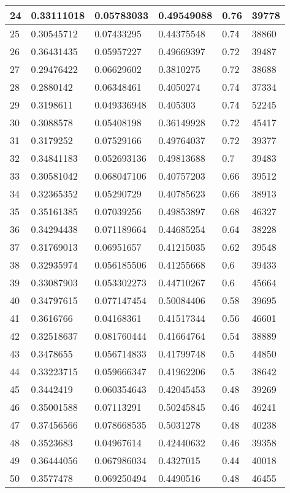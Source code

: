 \begin{longtable}{|l|l|l|l|l|l|}
24 & 0.33111018 & 0.05783033 & 0.49549088 & 0.76 & 39778 \\ \hline 
25 & 0.30545712 & 0.07433295 & 0.44375548 & 0.74 & 38860 \\ \hline 
26 & 0.36431435 & 0.05957227 & 0.49669397 & 0.72 & 39487 \\ \hline 
27 & 0.29476422 & 0.06629602 & 0.3810275 & 0.72 & 38688 \\ \hline 
28 & 0.2880142 & 0.06348461 & 0.4050274 & 0.74 & 37334 \\ \hline 
29 & 0.3198611 & 0.049336948 & 0.405303 & 0.74 & 52245 \\ \hline 
30 & 0.3088578 & 0.05408198 & 0.36149928 & 0.72 & 45417 \\ \hline 
31 & 0.3179252 & 0.07529166 & 0.49764037 & 0.72 & 39377 \\ \hline 
32 & 0.34841183 & 0.052693136 & 0.49813688 & 0.7 & 39483 \\ \hline 
33 & 0.30581042 & 0.068047106 & 0.40757203 & 0.66 & 39512 \\ \hline 
34 & 0.32365352 & 0.05290729 & 0.40785623 & 0.66 & 38913 \\ \hline 
35 & 0.35161385 & 0.07039256 & 0.49853897 & 0.68 & 46327 \\ \hline 
36 & 0.34294438 & 0.071189664 & 0.44685254 & 0.64 & 38228 \\ \hline 
37 & 0.31769013 & 0.06951657 & 0.41215035 & 0.62 & 39548 \\ \hline 
38 & 0.32935974 & 0.056185506 & 0.41255668 & 0.6 & 39433 \\ \hline 
39 & 0.33087903 & 0.053302273 & 0.44710267 & 0.6 & 45664 \\ \hline 
40 & 0.34797615 & 0.077147454 & 0.50084406 & 0.58 & 39695 \\ \hline 
41 & 0.3616766 & 0.04168361 & 0.41517344 & 0.56 & 46601 \\ \hline 
42 & 0.32518637 & 0.081760444 & 0.41664764 & 0.54 & 38889 \\ \hline 
43 & 0.3478655 & 0.056714833 & 0.41799748 & 0.5 & 44850 \\ \hline 
44 & 0.33223715 & 0.059666347 & 0.41962206 & 0.5 & 38642 \\ \hline 
45 & 0.3442419 & 0.060354643 & 0.42045453 & 0.48 & 39269 \\ \hline 
46 & 0.35001588 & 0.07113291 & 0.50245845 & 0.46 & 46241 \\ \hline 
47 & 0.37456566 & 0.078668535 & 0.5031278 & 0.48 & 40238 \\ \hline 
48 & 0.3523683 & 0.04967614 & 0.42440632 & 0.46 & 39358 \\ \hline 
49 & 0.36444056 & 0.067986034 & 0.4327015 & 0.44 & 40018 \\ \hline 
50 & 0.3577478 & 0.069250494 & 0.4490516 & 0.48 & 46455 \\ \hline 
\end{longtable}